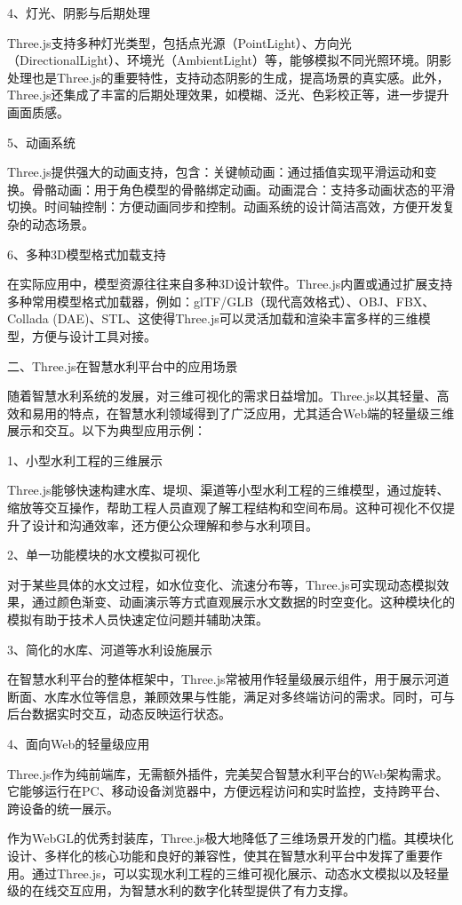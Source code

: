 4、灯光、阴影与后期处理

Three.js支持多种灯光类型，包括点光源（PointLight）、方向光（DirectionalLight）、环境光（AmbientLight）等，能够模拟不同光照环境。阴影处理也是Three.js的重要特性，支持动态阴影的生成，提高场景的真实感。此外，Three.js还集成了丰富的后期处理效果，如模糊、泛光、色彩校正等，进一步提升画面质感。

5、动画系统

Three.js提供强大的动画支持，包含：关键帧动画：通过插值实现平滑运动和变换。骨骼动画：用于角色模型的骨骼绑定动画。动画混合：支持多动画状态的平滑切换。时间轴控制：方便动画同步和控制。动画系统的设计简洁高效，方便开发复杂的动态场景。

6、多种3D模型格式加载支持

在实际应用中，模型资源往往来自多种3D设计软件。Three.js内置或通过扩展支持多种常用模型格式加载器，例如：glTF/GLB（现代高效格式）、OBJ、FBX、Collada (DAE)、STL、这使得Three.js可以灵活加载和渲染丰富多样的三维模型，方便与设计工具对接。

二、Three.js在智慧水利平台中的应用场景

随着智慧水利系统的发展，对三维可视化的需求日益增加。Three.js以其轻量、高效和易用的特点，在智慧水利领域得到了广泛应用，尤其适合Web端的轻量级三维展示和交互。以下为典型应用示例：

1、小型水利工程的三维展示

Three.js能够快速构建水库、堤坝、渠道等小型水利工程的三维模型，通过旋转、缩放等交互操作，帮助工程人员直观了解工程结构和空间布局。这种可视化不仅提升了设计和沟通效率，还方便公众理解和参与水利项目。

2、单一功能模块的水文模拟可视化

对于某些具体的水文过程，如水位变化、流速分布等，Three.js可实现动态模拟效果，通过颜色渐变、动画演示等方式直观展示水文数据的时空变化。这种模块化的模拟有助于技术人员快速定位问题并辅助决策。

3、简化的水库、河道等水利设施展示

在智慧水利平台的整体框架中，Three.js常被用作轻量级展示组件，用于展示河道断面、水库水位等信息，兼顾效果与性能，满足对多终端访问的需求。同时，可与后台数据实时交互，动态反映运行状态。

4、面向Web的轻量级应用

Three.js作为纯前端库，无需额外插件，完美契合智慧水利平台的Web架构需求。它能够运行在PC、移动设备浏览器中，方便远程访问和实时监控，支持跨平台、跨设备的统一展示。

作为WebGL的优秀封装库，Three.js极大地降低了三维场景开发的门槛。其模块化设计、多样化的核心功能和良好的兼容性，使其在智慧水利平台中发挥了重要作用。通过Three.js，可以实现水利工程的三维可视化展示、动态水文模拟以及轻量级的在线交互应用，为智慧水利的数字化转型提供了有力支撑。

